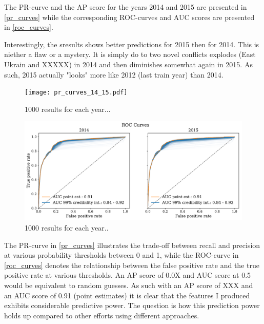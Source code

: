 \documentclass[a4paper]{article}
\begin{document}
The PR-curve and the AP score for the years 2014 and 2015 are presented in \autoref{pr_curves} while the corresponding ROC-curves and AUC scores are presented in \autoref{roc_curves}.\par 

Interestingly, the sresults shows better predictions for 2015 then for 2014. This is niether a flaw or a mystery. It is simply do to two novel conflicts explodes (East Ukrain and XXXXX) in 2014 and then diminishes somewhat again in 2015. As such, 2015 actually "looks" more like 2012 (last train year) than 2014.\par

\begin{figure}[!htb]
	\centering
	\texttt{[image: pr\_curves\_14\_15.pdf]}%
    \caption{\footnotesize{1000 results for each year...}}\label{pr_curves}
\end{figure}

\begin{figure}[!htb]
	\centering
	\includegraphics[scale=0.47]{roc_curves_14_15.pdf}
    \caption{\footnotesize{1000 results for each year..}}\label{roc_curves}
\end{figure}

The PR-curve in \autoref{pr_curves} illustrates the trade-off between recall and precision at various probability thresholds between 0 and 1, while the ROC-curve in \autoref{roc_curves} denotes the relationship between the false positive rate and the true positive rate at various thresholds. An AP score of 0.0X and AUC score at 0.5 would be equivalent to random guesses. As such with an AP score of XXX and an AUC score of 0.91 (point estimates) it is clear that the features I produced exhibits considerable predictive power. The question is how this prediction power holds up compared to other efforts using different approaches.\par
\end{document}
